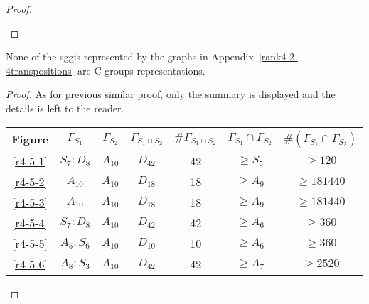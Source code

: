 \begin{proof}
\begin{figure}[H]
\begin{center}
      \caption{}
    \end{center}
  \end{figure}

\end{proof}

\begin{theorem}
  \label{rank4-3-th2}
  None of the sggis represented by the graphs in Appendix~\ref{rank4-2-4transpositions} are C-groups representations.
\end{theorem}

\begin{proof}
  As for previous similar proof, only the summary is displayed and the details is left to the reader.

  \begin{table}[H]
    \centering
    \begin{tabular}{|c|c|c|c|c|c|c|}
      \hline
      Figure & $\Gamma_{S_1}$ & $\Gamma_{S_2}$ & $\Gamma_{S_1 \cap S_2}$ & $\#\Gamma_{S_1 \cap S_2}$ & $\Gamma_{S_1} \cap \Gamma_{S_2}$ & $\#(\Gamma_{S_1} \cap \Gamma_{S_2})$ \\ \hline

      \ref{r4-5-1} & $S_7 : D_8$ & $A_{10}$ & $D_{42}$ & 42 & $\ge S_5$ & $\ge 120$ \\ \hline
      \ref{r4-5-2} & $A_{10}$ & $A_{10}$ & $D_{18}$ & 18 & $\ge A_9$ & $\ge 181440$ \\ \hline
      \ref{r4-5-3} & $A_{10}$ & $A_{10}$ & $D_{18}$ & 18 & $\ge A_9$ & $\ge 181440$ \\ \hline
      \ref{r4-5-4} & $S_7 : D_8$ & $A_{10}$ & $D_{42}$ & 42 & $\ge A_6$ & $\ge 360$ \\ \hline
      \ref{r4-5-5} & $A_5 : S_6$ & $A_{10}$ & $D_{10}$ & 10 & $\ge A_6$ & $\ge 360$ \\ \hline
      \ref{r4-5-6} & $A_8 : S_3$ & $A_{10}$ & $D_{42}$ & 42 & $\ge A_7$ & $\ge 2520$ \\ \hline

    \end{tabular}
  \end{table}
\end{proof}
